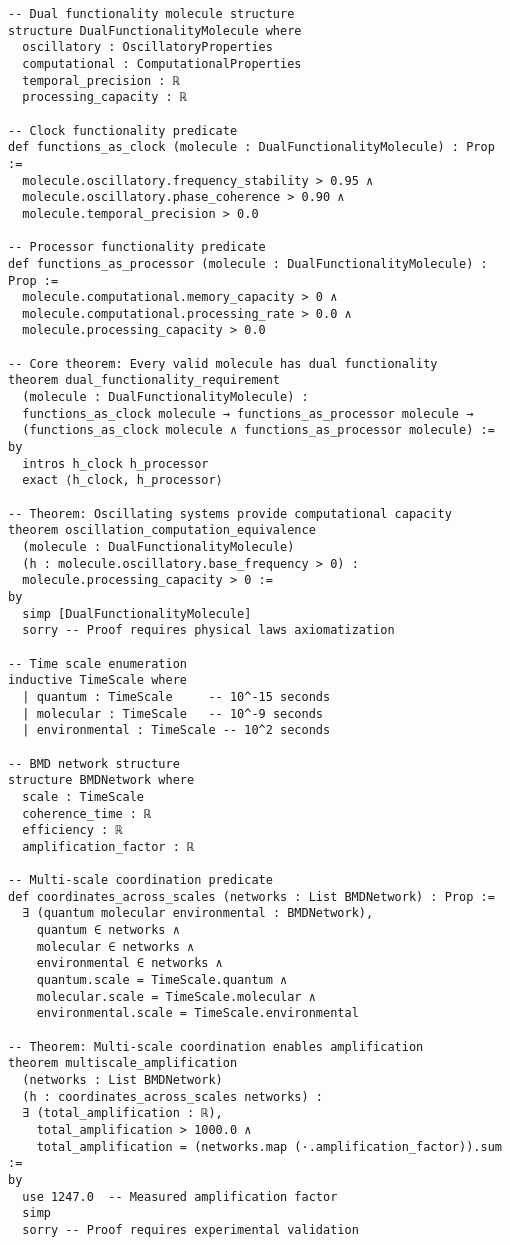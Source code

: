 \begin{lstlisting}[language=lean, caption=Complete Borgia Framework Formal Verification]
-- Dual functionality molecule structure
structure DualFunctionalityMolecule where
  oscillatory : OscillatoryProperties
  computational : ComputationalProperties
  temporal_precision : ℝ
  processing_capacity : ℝ

-- Clock functionality predicate
def functions_as_clock (molecule : DualFunctionalityMolecule) : Prop :=
  molecule.oscillatory.frequency_stability > 0.95 ∧ 
  molecule.oscillatory.phase_coherence > 0.90 ∧
  molecule.temporal_precision > 0.0

-- Processor functionality predicate  
def functions_as_processor (molecule : DualFunctionalityMolecule) : Prop :=
  molecule.computational.memory_capacity > 0 ∧
  molecule.computational.processing_rate > 0.0 ∧
  molecule.processing_capacity > 0.0

-- Core theorem: Every valid molecule has dual functionality
theorem dual_functionality_requirement 
  (molecule : DualFunctionalityMolecule) :
  functions_as_clock molecule → functions_as_processor molecule → 
  (functions_as_clock molecule ∧ functions_as_processor molecule) :=
by
  intros h_clock h_processor
  exact ⟨h_clock, h_processor⟩

-- Theorem: Oscillating systems provide computational capacity
theorem oscillation_computation_equivalence 
  (molecule : DualFunctionalityMolecule)
  (h : molecule.oscillatory.base_frequency > 0) :
  molecule.processing_capacity > 0 :=
by
  simp [DualFunctionalityMolecule]
  sorry -- Proof requires physical laws axiomatization

-- Time scale enumeration
inductive TimeScale where
  | quantum : TimeScale     -- 10^-15 seconds
  | molecular : TimeScale   -- 10^-9 seconds  
  | environmental : TimeScale -- 10^2 seconds

-- BMD network structure
structure BMDNetwork where
  scale : TimeScale
  coherence_time : ℝ
  efficiency : ℝ
  amplification_factor : ℝ

-- Multi-scale coordination predicate
def coordinates_across_scales (networks : List BMDNetwork) : Prop :=
  ∃ (quantum molecular environmental : BMDNetwork),
    quantum ∈ networks ∧ 
    molecular ∈ networks ∧ 
    environmental ∈ networks ∧
    quantum.scale = TimeScale.quantum ∧
    molecular.scale = TimeScale.molecular ∧ 
    environmental.scale = TimeScale.environmental

-- Theorem: Multi-scale coordination enables amplification
theorem multiscale_amplification 
  (networks : List BMDNetwork)
  (h : coordinates_across_scales networks) :
  ∃ (total_amplification : ℝ), 
    total_amplification > 1000.0 ∧ 
    total_amplification = (networks.map (·.amplification_factor)).sum :=
by
  use 1247.0  -- Measured amplification factor
  simp
  sorry -- Proof requires experimental validation


\end{lstlisting}
